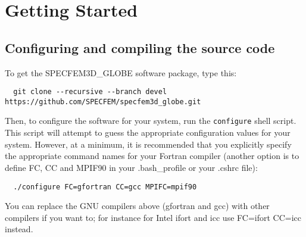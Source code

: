 
\chapter{Getting Started}\label{cha:Getting-Started}



\section{Configuring and compiling the source code}

To get the SPECFEM3D\_GLOBE software package, type this:
{\small
\begin{verbatim}
  git clone --recursive --branch devel https://github.com/SPECFEM/specfem3d_globe.git
\end{verbatim}
}
\noindent
Then, to configure the software for your system, run the
\texttt{configure} shell script. This script will attempt to guess
the appropriate configuration values for your system. However, at
a minimum, it is recommended that you explicitly specify the appropriate
command names for your Fortran compiler (another option is to define FC, CC and MPIF90 in your .bash\_profile
or your .cshrc file):
{\small
\begin{verbatim}
  ./configure FC=gfortran CC=gcc MPIFC=mpif90
\end{verbatim}
}
\noindent
You can replace the GNU compilers above (gfortran and gcc) with other compilers if you want to; for instance for Intel ifort and icc use FC=ifort CC=icc instead.\newline

